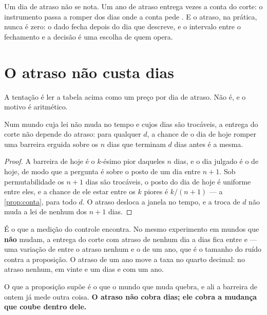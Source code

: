 Um dia de atraso não se nota. Um ano de atraso entrega \numAgoraRazaoDuzentosECinquentaEDois{} vezes a conta do
corte: o instrumento passa a romper \numAgoraEntregaDuzentosECinquentaEDois{} dos dias onde a conta
pede \numAgoraPromessa{}. E o atraso, na prática, nunca é zero: o dado fecha depois do dia que
descreve, e o intervalo entre o fechamento e a decisão é uma escolha de quem opera.

\section{O atraso não custa dias}

A tentação é ler a tabela acima como um preço por dia de atraso. Não é, e o motivo é aritmético.

\begin{proposicao}\label{prop:atraso-parado}
Num mundo cuja lei não muda no tempo e cujos dias são trocáveis, a entrega do corte não depende do
atraso: para qualquer $d$, a chance de o dia de hoje romper uma barreira erguida sobre os $n$ dias
que terminam $d$ dias antes é a mesma.
\end{proposicao}

\begin{proof}
A barreira de hoje é o $k$-ésimo pior daqueles $n$ dias, e o dia julgado é o de hoje, de modo que
a pergunta é sobre o posto de um dia entre $n+1$. Sob permutabilidade os $n+1$ dias são trocáveis,
o posto do dia de hoje é uniforme entre eles, e a chance de ele estar entre os $k$ piores é
$k/(n+1)$ --- a \cref{prop:conta}, para todo $d$. O atraso desloca a janela no tempo, e a troca de
$d$ não muda a lei de nenhum dos $n+1$ dias.
\end{proof}

É o que a medição do controle encontra. No mesmo experimento em \numAgoraSementes{} mundos que
\textbf{não} mudam, a entrega do corte com atraso de nenhum dia a \numAgoraAtrasoMaior{} dias fica
entre \numAgoraParadoMenor{} e \numAgoraParadoMaior{} --- uma variação de \numAgoraParadoVariacao{}
entre o atraso nenhum e o de um ano, que é o tamanho do ruído contra a proposição. O atraso de um
ano move a taxa no quarto decimal: \numAgoraParadoZero{} no atraso nenhum,
\numAgoraParadoVinteEUm{} em vinte e um dias e \numAgoraParadoMaior{} com um ano.

O que a proposição supõe é o que o mundo que muda quebra, e ali a barreira de ontem já mede outra
coisa. \textbf{O atraso não cobra dias; ele cobra a mudança que coube dentro dele.}

